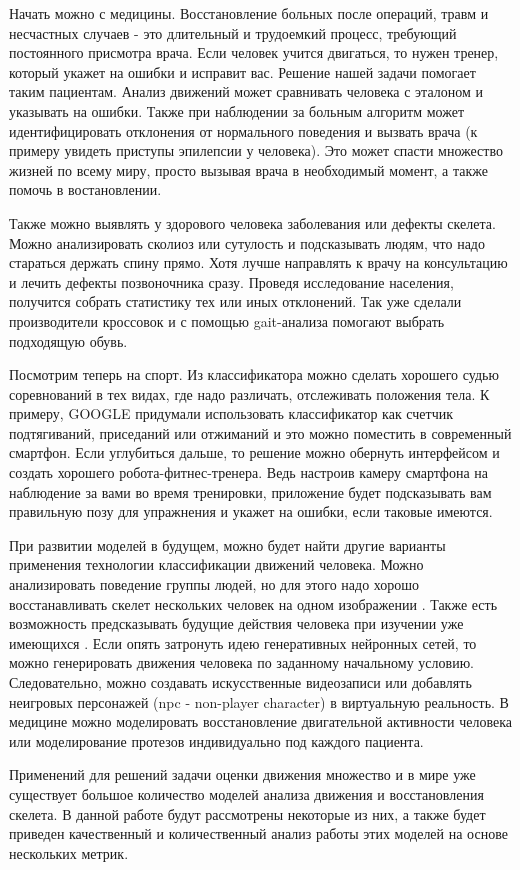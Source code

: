 Начать можно с медицины. Восстановление больных после операций, травм и несчастных случаев - это длительный и трудоемкий процесс, требующий постоянного присмотра врача. Если человек учится двигаться, то нужен тренер, который укажет  на ошибки и исправит вас. Решение нашей задачи помогает таким пациентам. Анализ движений может сравнивать человека с эталоном и указывать на ошибки. Также при наблюдении за больным алгоритм может идентифицировать отклонения от нормального поведения и вызвать врача (к примеру увидеть приступы эпилепсии у человека). Это может спасти множество жизней по всему миру, просто вызывая врача в необходимый момент, а также помочь в востановлении.

Также можно выявлять у здорового человека заболевания или дефекты скелета. Можно анализировать сколиоз или сутулость и подсказывать людям, что надо стараться держать спину прямо. Хотя лучше направлять к врачу на консультацию и лечить дефекты позвоночника сразу. Проведя исследование населения, получится собрать статистику тех или иных отклонений. Так уже сделали производители кроссовок и с помощью gait-анализа \cite{WHITTLE1996369} помогают выбрать подходящую обувь.

Посмотрим теперь на спорт. Из классификатора можно сделать хорошего судью соревнований в тех видах, где надо различать, отслеживать положения тела. К примеру, GOOGLE придумали использовать классификатор как счетчик подтягиваний, приседаний или отжиманий \cite{counter} и это можно поместить в современный смартфон. Если углубиться дальше, то решение можно обернуть интерфейсом и создать хорошего робота-фитнес-тренера. Ведь настроив камеру смартфона на наблюдение за вами во время тренировки, приложение будет подсказывать вам правильную позу для упражнения и укажет на ошибки, если таковые имеются.

\hfill \break
При развитии моделей в будущем, можно будет найти другие варианты применения технологии классификации движений человека. Можно анализировать поведение группы людей, но для этого надо хорошо восстанавливать скелет нескольких человек на одном изображении \cite{OpenPose, https://doi.org/10.48550/arxiv.1807.04067, fang2017rmpe}. Также есть возможность предсказывать будущие действия человека при изучении уже имеющихся \cite{s20174944}. Если опять затронуть идею генеративных нейронных сетей, то можно генерировать движения человека по заданному начальному условию. Следовательно, можно создавать искусственные видеозаписи или добавлять неигровых персонажей (npc - non-player character) в виртуальную реальность. В медицине можно моделировать восстановление двигательной активности человека или моделирование протезов индивидуально под каждого пациента.

Применений для решений задачи оценки движения множество и в мире уже существует большое количество моделей анализа движения и восстановления скелета. В данной работе будут рассмотрены некоторые из них, а также будет приведен качественный и количественный анализ работы этих моделей на основе нескольких метрик.


\newpage